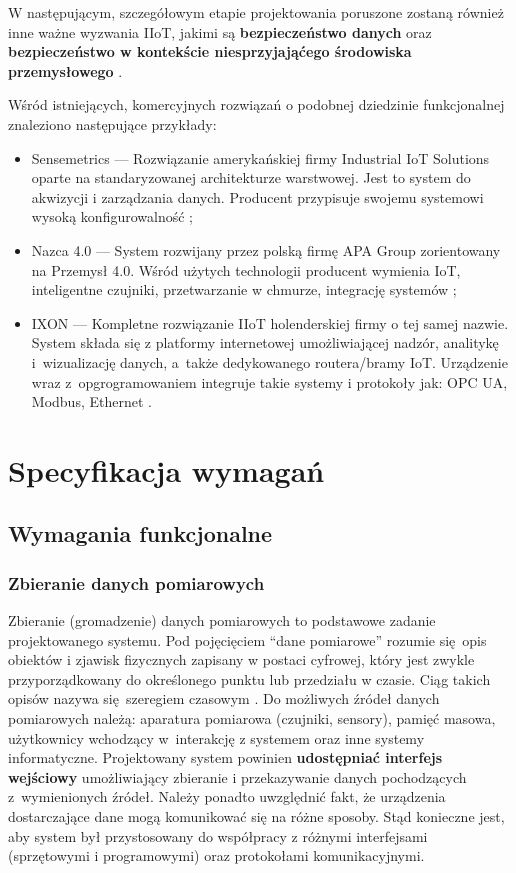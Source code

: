 \documentclass[a4paper, 12pt, twoside]{article}
\begin{document}
W następującym, szczegółowym etapie projektowania poruszone zostaną również
inne ważne wyzwania IIoT, jakimi są \textbf{bezpieczeństwo danych} oraz \textbf{bezpieczeństwo w kontekście niesprzyjająćego
    środowiska przemysłowego} \cite{iiot-challenges-opportunities-directions}.

Wśród istniejących, komercyjnych rozwiązań o podobnej dziedzinie funkcjonalnej
znaleziono następujące przykłady:
\begin{itemize}
    \itemsep0em
    \item Sensemetrics --- Rozwiązanie amerykańskiej firmy Industrial IoT Solutions
          oparte na standaryzowanej architekturze warstwowej. Jest to system do akwizycji
          i zarządzania danych. Producent przypisuje swojemu systemowi wysoką konfigurowalność \cite{sensmetrics};
    \item Nazca 4.0 --- System rozwijany przez polską firmę APA Group zorientowany na Przemysł 4.0.
          Wśród użytych technologii producent wymienia IoT, inteligentne czujniki,
          przetwarzanie w chmurze, integrację systemów \cite{nazca};
    \item IXON --- Kompletne rozwiązanie IIoT holenderskiej firmy o tej samej nazwie.
          System składa się z platformy internetowej umożliwiającej nadzór, analitykę i~wizualizację danych,
          a~także dedykowanego routera/bramy IoT. Urządzenie wraz z~opgrogramowaniem
          integruje takie systemy i protokoły jak: OPC UA, Modbus, Ethernet \cite{ixon}.
\end{itemize}


\section{Specyfikacja wymagań}\label{wymagania}

\subsection{Wymagania funkcjonalne}

\subsubsection{Zbieranie danych pomiarowych}

Zbieranie (gromadzenie) danych pomiarowych to podstawowe zadanie projektowanego systemu.
Pod pojęcięciem ``dane pomiarowe'' rozumie się opis obiektów i zjawisk fizycznych
zapisany w postaci cyfrowej, który jest zwykle przyporządkowany do określonego
punktu lub przedziału w czasie. Ciąg takich opisów nazywa się szeregiem czasowym \cite{time-series}.
Do możliwych źródeł danych pomiarowych należą: aparatura pomiarowa (czujniki, sensory),
pamięć masowa, użytkownicy wchodzący w~interakcję z systemem oraz inne systemy informatyczne.
Projektowany system powinien \textbf{udostępniać interfejs wejściowy} umożliwiający zbieranie
i przekazywanie danych pochodzących z~wymienionych źródeł. Należy ponadto uwzględnić
fakt, że urządzenia dostarczające dane mogą komunikować się na różne sposoby.
Stąd konieczne jest, aby system był przystosowany do współpracy z różnymi
interfejsami (sprzętowymi i programowymi) oraz protokołami komunikacyjnymi.
\end{document}
